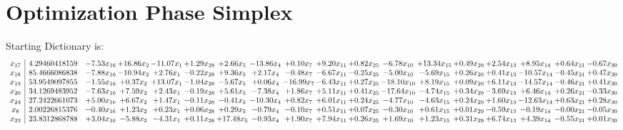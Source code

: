 \documentclass[9pt]{article}
\begin{document}
\section{Optimization Phase Simplex}
Starting Dictionary is:
\[\begin{array}{c| c c@{\hskip 2pt} c@{\hskip 2pt} c@{\hskip 2pt} c@{\hskip 2pt} c@{\hskip 2pt} c@{\hskip 2pt} c@{\hskip 2pt} c@{\hskip 2pt} c@{\hskip 2pt} c@{\hskip 2pt} c@{\hskip 2pt} c@{\hskip 2pt} c@{\hskip 2pt} c@{\hskip 2pt} c@{\hskip 2pt} c@{\hskip 2pt} }
 x_{17}   &  4.29460418159 & -7.53 x_{16} & + 16.86 x_{2} & -11.07 x_{1} & +  1.29 x_{28} & +  2.66 x_{5} & -13.86 x_{4} & +  0.10 x_{7} & +  9.20 x_{11} & +  0.82 x_{25} & -6.78 x_{10} & + 13.34 x_{15} & +  0.49 x_{29} & +  2.54 x_{13} & +  8.95 x_{14} & +  0.64 x_{21} & -0.67 x_{30}\\
 x_{18}   &  85.4666086838 & -7.88 x_{16} & -10.94 x_{2} & +  2.76 x_{1} & -0.22 x_{28} & +  9.36 x_{5} & +  2.17 x_{4} & -0.48 x_{7} & -6.67 x_{11} & -0.25 x_{25} & -5.00 x_{10} & -5.69 x_{15} & +  0.26 x_{29} & +  0.41 x_{13} & -10.57 x_{14} & -0.45 x_{21} & +  0.47 x_{30}\\
 x_{19}   &  53.9549097855 & -1.55 x_{16} & +  0.37 x_{2} & + 13.07 x_{1} & -1.04 x_{28} & -5.67 x_{5} & +  0.06 x_{4} & -16.99 x_{7} & -6.43 x_{11} & +  0.27 x_{25} & -18.10 x_{10} & +  8.19 x_{15} & +  0.09 x_{29} & +  6.11 x_{13} & -14.57 x_{14} & -0.46 x_{21} & +  0.41 x_{30}\\
 x_{20}   &  34.1269483952 & -7.63 x_{16} & +  7.59 x_{2} & +  2.43 x_{1} & -0.19 x_{28} & +  5.61 x_{5} & -7.38 x_{4} & +  1.86 x_{7} & +  5.11 x_{11} & +  0.41 x_{25} & -17.64 x_{10} & -4.74 x_{15} & +  0.34 x_{29} & -3.69 x_{13} & +  6.46 x_{14} & +  0.26 x_{21} & -0.33 x_{30}\\
 x_{24}   &  27.2422661073 & +  5.00 x_{16} & +  6.67 x_{2} & +  1.47 x_{1} & -0.11 x_{28} & -0.41 x_{5} & -10.30 x_{4} & +  0.82 x_{7} & +  6.01 x_{11} & +  0.24 x_{25} & -4.77 x_{10} & -4.63 x_{15} & +  0.24 x_{29} & +  1.60 x_{13} & -12.63 x_{14} & +  0.63 x_{21} & +  0.28 x_{30}\\
 x_{8}   &  2.00226815376 & -0.40 x_{16} & +  1.23 x_{2} & +  0.23 x_{1} & +  0.06 x_{28} & +  0.29 x_{5} & -0.79 x_{4} & -0.10 x_{7} & +  0.51 x_{11} & +  0.07 x_{25} & -0.30 x_{10} & +  0.61 x_{15} & +  0.01 x_{29} & -0.59 x_{13} & -0.19 x_{14} & -0.00 x_{21} & -0.05 x_{30}\\
 x_{23}   &  23.8312868788 & +  3.04 x_{16} & -5.88 x_{2} & -4.31 x_{1} & +  0.11 x_{28} & + 17.48 x_{5} & -0.93 x_{4} & +  1.90 x_{7} & +  7.94 x_{11} & +  0.26 x_{25} & +  1.69 x_{10} & +  1.23 x_{15} & +  0.31 x_{29} & +  6.74 x_{13} & +  4.39 x_{14} & -0.55 x_{21} & +  0.01 x_{30}\\

\end{array}\]
\end{document}
